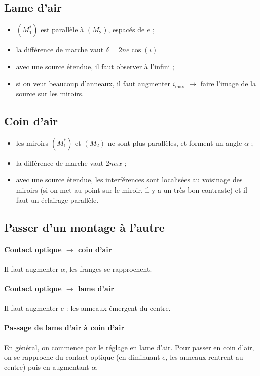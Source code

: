 \documentclass[french]{book}
\theoremstyle{plain}
\theoremstyle{definition}
\theoremstyle{remark}
\newcommand{\st}{^*}
\begin{document}
\subsection{Lame d'air}
\begin{itemize}
	\item $(M_1\st)$ est parallèle à $(M_2)$, espacés de $e$ ;
	\item la différence de marche vaut $\delta=2ne\cos(i)$
	\item avec une source étendue, il faut observer à l'infini ;
	\item si on veut beaucoup d'anneaux, il faut augmenter $i_\text{max}$ $\rightarrow$ faire l'image de la source sur les miroirs.
\end{itemize}
\subsection{Coin d'air}
\begin{itemize}
	\item les miroirs $(M_1\st)$ et $(M_2)$ ne sont plus parallèles, et forment un angle $\alpha$ ;
	\item la différence de marche vaut $2n\alpha x$ ;
	\item avec une source étendue, les interférences sont localisées au voisinage des miroirs (si on met au point sur le miroir, il y a un très bon contraste) et il faut un éclairage parallèle.
\end{itemize}
\subsection{Passer d'un montage à l'autre}
\paragraph{Contact optique $\to$ coin d'air} Il faut augmenter $\alpha$, les franges se rapprochent.
\paragraph{Contact optique $\to$ lame d'air} Il faut augmenter $e$ : les anneaux émergent du centre.
\paragraph{Passage de lame d'air à coin d'air} En général, on commence par le réglage en lame d'air. Pour passer en coin d'air, on se rapproche du contact optique (en diminuant $e$, les anneaux rentrent au centre) puis en augmentant $\alpha$. 
\end{document}
